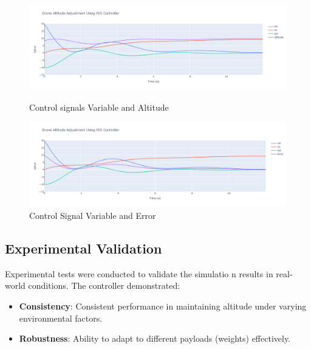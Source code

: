 \documentclass[a4paper,12pt]{article}
\begin{document}
\begin{figure}
    \centering
    \includegraphics[width=1\linewidth,height=0.6
    \linewidth]{photos/altitude_control_signals.png}
    \caption{Control signals Variable and Altitude}
    \label{fig:enter-label}
    \centering
    \includegraphics[width=1\linewidth,height=0.6
    \linewidth]{photos/error_and_signals.png}
    \caption{Control Signal Variable and Error}
    \label{fig:enter-label}
\end{figure}

\subsection{Experimental Validation}

Experimental tests were conducted to validate the simulatio n results in real-world conditions. The controller demonstrated:

\begin{itemize}
    \item \textbf{Consistency}: Consistent performance in maintaining altitude under varying environmental factors.
    \item \textbf{Robustness}: Ability to adapt to different payloads (weights) effectively.
\end{itemize}
\end{document}
